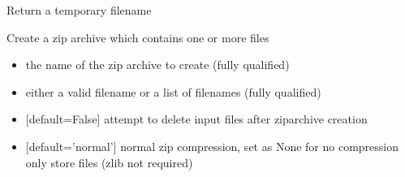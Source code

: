 \documentclass[letterpaper,10pt,english]{sphinxmanual}
\begin{document}

\begin{fulllineitems}
\label{\detokenize{modules_doc:cbmpy.CBTools.createTempFileName}}
\pysigstartsignatures
{}
\pysigstopsignatures
\sphinxAtStartPar
Return a temporary filename

\end{fulllineitems}


\begin{fulllineitems}
\label{\detokenize{modules_doc:cbmpy.CBTools.createZipArchive}}
\pysigstartsignatures
{}
\pysigstopsignatures
\sphinxAtStartPar
Create a zip archive which contains one or more files
\begin{itemize}
\item {} 
\sphinxAtStartPar
{} the name of the zip archive to create (fully qualified)

\item {} 
\sphinxAtStartPar
{} either a valid filename or a list of filenames (fully qualified)

\item {} 
\sphinxAtStartPar
{} {[}default=False{]} attempt to delete input files after zip\sphinxhyphen{}archive creation

\item {} 
\sphinxAtStartPar
{} {[}default=’normal’{]} normal zip compression, set as None for no compression only store files (zlib not required)

\end{itemize}

\end{fulllineitems}

\end{document}
